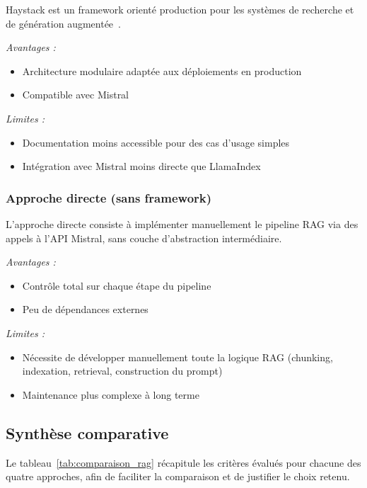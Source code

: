 Haystack est un framework orienté production pour les systèmes de
recherche et de génération augmentée~\cite{haystack_dev}.

\textit{Avantages :}
\begin{itemize}
  \item Architecture modulaire adaptée aux déploiements en production
  \item Compatible avec Mistral
\end{itemize}

\textit{Limites :}
\begin{itemize}
  \item Documentation moins accessible pour des cas d'usage simples
  \item Intégration avec Mistral moins directe que LlamaIndex
\end{itemize}

\subsubsection{Approche directe (sans framework)}

L'approche directe consiste à implémenter manuellement le pipeline RAG
via des appels à l'API Mistral, sans couche d'abstraction intermédiaire.

\textit{Avantages :}
\begin{itemize}
  \item Contrôle total sur chaque étape du pipeline
  \item Peu de dépendances externes
\end{itemize}

\textit{Limites :}
\begin{itemize}
  \item Nécessite de développer manuellement toute la logique RAG
        (chunking, indexation, retrieval, construction du prompt)
  \item Maintenance plus complexe à long terme
\end{itemize}

\subsection{Synthèse comparative}

Le tableau~\ref{tab:comparaison_rag} récapitule les critères évalués pour chacune des
quatre approches, afin de faciliter la comparaison et de justifier
le choix retenu.

